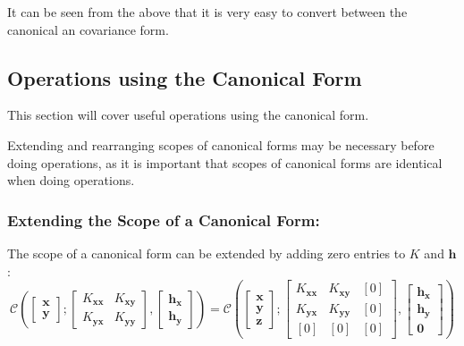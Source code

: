 \documentclass[12pt,oneside,openany,a4paper, %
afrikaans,english,
]{memoir}
\numberwithin{equation}{chapter}
\begin{document}
It can be seen from the above that it is very easy to convert between the canonical an covariance form. 
\subsection{Operations using the Canonical Form}
This section will cover useful operations using the canonical form. 

Extending and rearranging scopes of canonical forms may be necessary before doing operations, as it is important that scopes of canonical forms are identical when doing operations. 
\subsubsection{Extending the Scope of a Canonical Form:}
The scope of a canonical form can be extended by adding zero entries to $K$ and $\bm{h}$:
\begin{equation}
\mathcal{C}\left(
\begin{bmatrix}
\bm{x}\\
\bm{y}
\end{bmatrix};
\begin{bmatrix}
K_{\bm{xx}} & K_{\bm{xy}}\\
K_{\bm{yx}} & K_{\bm{yy}}
\end{bmatrix},
\begin{bmatrix}
\bm{h_x}\\
\bm{h_y}
\end{bmatrix}
\right)
=
\mathcal{C}\left(
\begin{bmatrix}
\bm{x}\\
\bm{y}\\
\bm{z}
\end{bmatrix};
\begin{bmatrix}
K_{\bm{xx}} & K_{\bm{xy}} & [0]\\
K_{\bm{yx}} & K_{\bm{yy}} & [0]\\
[0] & [0] & [0]
\end{bmatrix},
\begin{bmatrix}
\bm{h_x}\\
\bm{h_y}\\
\bm{0}
\end{bmatrix}
\right)
\end{equation}
\end{document}
